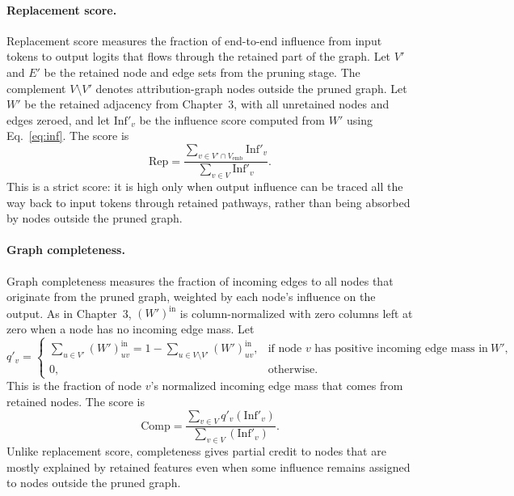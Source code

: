 \documentclass[../main.tex]{subfiles}
\begin{document}
\paragraph{Replacement score.}
Replacement score measures the fraction of end-to-end influence from input
tokens to output logits that flows through the retained part of the graph. Let
$V'$ and $E'$ be the retained node and edge sets from the pruning stage. The
complement $V \setminus V'$ denotes attribution-graph nodes outside the pruned
graph. Let $W'$ be the retained adjacency from Chapter~3, with all unretained
nodes and edges zeroed, and let $\mathrm{Inf}'_v$ be the influence score computed from $W'$ using
Eq.~\eqref{eq:inf}. The score is
\begin{equation}
\mathrm{Rep}
=
\frac{\sum_{v \in V' \cap V_{\text{emb}}} \mathrm{Inf}'_v}
     {\sum_{v \in V} \mathrm{Inf}'_v}.
\label{eq:metric-replacement}
\end{equation}
This is a strict score: it is high only when output influence can be traced all
the way back to input tokens through retained pathways, rather than being
absorbed by nodes outside the pruned graph.

\paragraph{Graph completeness.}
Graph completeness measures the fraction of incoming edges to all nodes that
originate from the pruned graph, weighted by each node's influence on the output.
As in Chapter~3, $(W')^{\text{in}}$ is column-normalized with zero columns left
at zero when a node has no incoming edge mass. Let
\[
q'_v =
\begin{cases}
\sum_{u \in V'} (W')^{\text{in}}_{uv}
= 1 - \sum_{u \in V \setminus V'} (W')^{\text{in}}_{uv},
& \text{if node } v \text{ has positive incoming edge mass in } W',\\
0, & \text{otherwise.}
\end{cases}
\]
This is the fraction of node $v$'s normalized incoming edge mass that comes from
retained nodes. The score is
\begin{equation}
\mathrm{Comp}
=
\frac{\sum_{v \in V} q'_v(\mathrm{Inf}'_v)}
     {\sum_{v \in V}(\mathrm{Inf}'_v)}.
\label{eq:metric-completeness}
\end{equation}
Unlike replacement score, completeness gives partial credit to nodes that are
mostly explained by retained features even when some influence remains assigned
to nodes outside the pruned graph.
\end{document}
